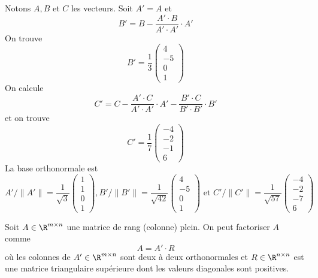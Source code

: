 \begin{example}
Notons $A,B$ et $C$ les vecteurs. Soit $A'=A$ et 
\begin{displaymath}
  B' = B - \frac{A'\cdot B}{A'\cdot A'} \cdot A'
\end{displaymath}
On trouve 
\begin{displaymath}
  B' = \frac{1}{3}
  \begin{pmatrix}
    4\\-5\\0\\1
  \end{pmatrix}
\end{displaymath}
On calcule 
\begin{displaymath}
  C' = C - \frac{A'\cdot C}{A'\cdot A'} \cdot A' - \frac{B'\cdot C}{B'\cdot B'} \cdot B'
\end{displaymath}
et on trouve 
\begin{displaymath}
  C' = \frac{1}{7}
  \begin{pmatrix}
    -4\\-2\\-1\\6
  \end{pmatrix}  
\end{displaymath}
La base orthonormale est
\begin{displaymath}
  A' / \|A'\| = \frac{1}{\sqrt{3}}
  \begin{pmatrix}
    1\\1\\0\\1
  \end{pmatrix},
    B'/ \|B'\| = \frac{1}{\sqrt{42}}
  \begin{pmatrix}
    4\\-5\\0\\1
  \end{pmatrix}
\text{ et }
C'/ \|C'\| = \frac{1}{\sqrt{57}}
  \begin{pmatrix}
    -4\\-2\\-7\\6
  \end{pmatrix}  
\end{displaymath}
\end{example}

\begin{corollary}
  \label{co:2}
  Soit $A \in \R^{m\times n}$ une matrice de rang (colonne) plein. On peut factoriser $A$ comme 
  \begin{displaymath}
    A = A' \cdot R
  \end{displaymath}
où les colonnes de  $A' \in \R^{m\times n}$ sont deux à deux orthonormales et $R \in \R^{n \times n}$ est une matrice triangulaire supérieure dont les valeurs diagonales sont positives. 
\end{corollary}



